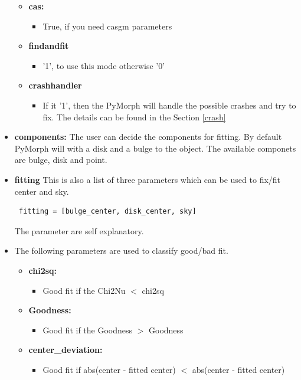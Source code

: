 \documentclass[a4paper,12pt]{article}
\begin{document}
\begin{itemize}
\begin{itemize}
\item[] \textbf{cas:}
\begin{itemize}
\item True, if you need casgm parameters
\end{itemize}

\item[] \textbf{findandfit}
\begin{itemize}
\item '1', to use this mode otherwise '0'
\end{itemize}

\item[] \textbf{crashhandler}
\begin{itemize}
\item If it '1', then the PyMorph will handle the possible crashes and try to fix. The details can be found in the Section \ref{crash}
\end{itemize}

\end{itemize}

\item \textbf{components:} The user can decide the components for fitting. By default PyMorph will with a disk and a bulge to the object. The available componets are bulge, disk and point.
\item \textbf{fitting} This is also a list of three parameters which can be used to fix/fit center and sky.
\begin{verbatim} fitting = [bulge_center, disk_center, sky]
\end{verbatim}
The parameter are self explanatory.
\item The following parameters are used to classify good/bad fit.
\begin{itemize}
\item[] \textbf{chi2sq:}
\begin{itemize}
\item Good fit if the Chi2Nu $<$ chi2sq
\end{itemize}

\item[] \textbf{Goodness:}
\begin{itemize}
\item Good fit if the Goodness $>$ Goodness
\end{itemize}

\item[] \textbf{center\_deviation:}
\begin{itemize}
\item Good fit if abs(center - fitted center) $<$ abs(center - fitted center)
\end{itemize}

\end{itemize}

\end{itemize}
\end{document}
